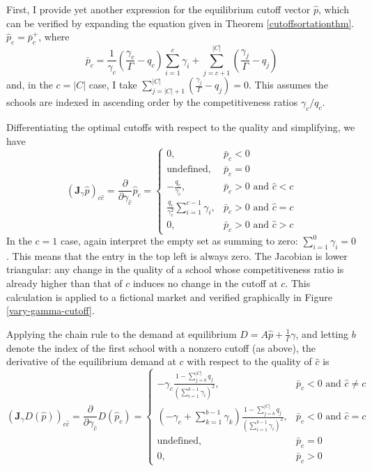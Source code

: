 \documentclass[12pt]{article}
\numberwithin{equation}{subsection}
\theoremstyle{definition}
\begin{document}
First, I provide yet another expression for the equilibrium cutoff vector $\hat p$, which can be verified by expanding the equation given in Theorem \ref{cutoffsortationthm}. $\hat p_c = \bar p_c^+$, where
\begin{equation} \label{yetanothereqcutoff}
\bar p_c = 
\frac{1}{\gamma_c} \left(\frac{\gamma_c}{\Gamma} - q_c\right) \sum_{i=1}^{c} \gamma_i 
+ \sum_{j=c+1}^{|C|} \left( \frac{\gamma_j}{\Gamma} - q_j \right)
\end{equation}
and, in the $c = |C|$ case, I take $\sum_{j=|C|+1}^{|C|} \left( \frac{\gamma_j}{\Gamma} - q_j \right)= 0$. This assumes the schools are indexed in ascending order by the competitiveness ratios $\gamma_c / q_c$. 

Differentiating the optimal cutoffs with respect to the quality and simplifying, we have
\begin{equation}\label{jac-gamma-p}
\left(\mathbf{J}_\gamma \hat p\right)_{c\hat c} =
\frac{\partial}{\partial\gamma_{\hat c}} \hat p_c = \begin{cases}
0, & \bar p_c < 0 \\
\text{undefined}, & \bar p_c = 0 \\
 - \frac{q_c}{\gamma_c}, & \bar p_c > 0 \text{ and }\hat c < c \\
\frac{q_c}{\gamma_c^2} \sum_{i=1}^{c-1} \gamma_i, & \bar p_c > 0 \text{ and }\hat c = c\\
0, & \bar p_c > 0 \text{ and }\hat c > c
\end{cases}
\end{equation}
In the $c=1$ case, again interpret the empty set as summing to zero: $\sum_{i=1}^{0} \gamma_i = 0$. This means that the entry in the top left is always zero. The Jacobian is lower triangular: any change in the quality of a school whose competitiveness ratio is already higher than that of $c$ induces no change in the cutoff at $c$. This calculation is applied to a fictional market and verified graphically in Figure \ref{vary-gamma-cutoff}.

Applying the chain rule to the demand at equilibrium $D = A \hat p + \frac{1}{\Gamma} \gamma$, and letting $b$ denote the index of the first school with a nonzero cutoff (as above), the derivative of the equilibrium demand at $c$ with respect to the quality of $\hat c$ is
\begin{equation} \label{jac-gamma-demand}
\left(\mathbf{J}_\gamma D\left(\hat p\right)\right)_{c\hat c} =
\frac{\partial}{\partial\gamma_{\hat c}} D(\hat p_c) = \begin{cases}
-\gamma_c \frac{1 - \sum_{j=b}^{|C|} q_j}{\left(\sum_{i=1}^{b-1} \gamma_i\right)^2}, & \bar p_c < 0 \text{ and }\hat c \neq c \\
\left(- \gamma_c + \sum_{k=1}^{b-1} \gamma_k\right)\frac{1 - \sum_{j=b}^{|C|} q_j}{\left(\sum_{i=1}^{b-1} \gamma_i\right)^2}, & \bar p_c < 0 \text{ and }\hat c = c\\
\text{undefined}, & \bar p_c = 0 \\
0, & \bar p_c > 0
\end{cases}
\end{equation}
\end{document}
